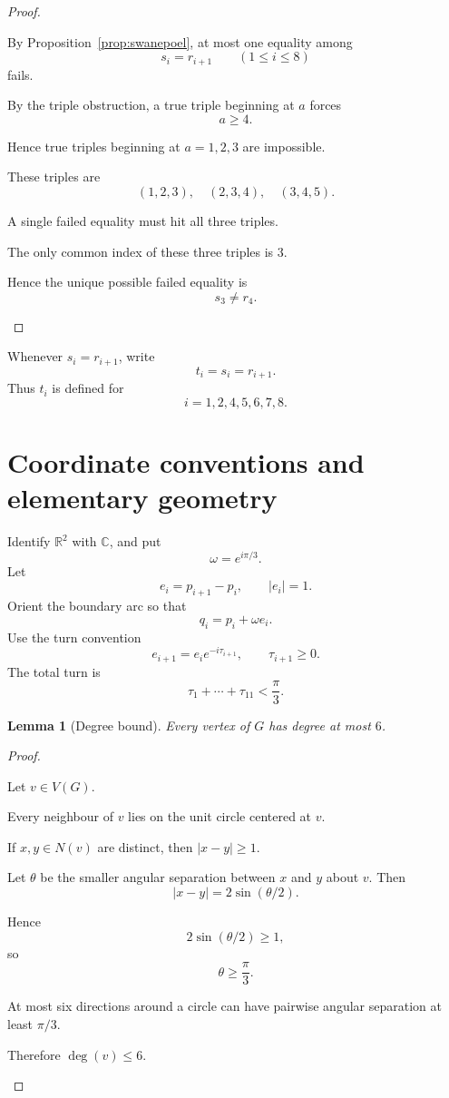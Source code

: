 \documentclass[11pt]{article}
\newtheorem{lemma}{Lemma}
\newcommand{\R}{\mathbb{R}}
\newcommand{\C}{\mathbb{C}}
\begin{document}
\begin{proof}
\begin{lamport}
\item By Proposition~\ref{prop:swanepoel}, at most one equality among
\[
  s_i=r_{i+1}\qquad(1\le i\le 8)
\]
fails.
\item By the triple obstruction, a true triple beginning at $a$ forces
\[
  a\ge 4.
\]
\item Hence true triples beginning at $a=1,2,3$ are impossible.
\item These triples are
\[
  (1,2,3),\quad (2,3,4),\quad (3,4,5).
\]
\item A single failed equality must hit all three triples.
\item The only common index of these three triples is $3$.
\item Hence the unique possible failed equality is
\[
  s_3\ne r_4.
\]
\end{lamport}
\end{proof}

Whenever $s_i=r_{i+1}$, write
\[
  t_i=s_i=r_{i+1}.
\]
Thus $t_i$ is defined for
\[
  i=1,2,4,5,6,7,8.
\]

\section{Coordinate conventions and elementary geometry}

Identify $\R^2$ with $\C$, and put
\[
  \omega=e^{i\pi/3}.
\]
Let
\[
  e_i=p_{i+1}-p_i,
  \qquad |e_i|=1.
\]
Orient the boundary arc so that
\[
  q_i=p_i+\omega e_i.
\]
Use the turn convention
\[
  e_{i+1}=e_i e^{-i\tau_{i+1}},
  \qquad \tau_{i+1}\ge 0.
\]
The total turn is
\[
  \tau_1+\cdots+\tau_{11}<\frac{\pi}{3}.
\]

\begin{lemma}[Degree bound]\label{lem:degree-bound}
Every vertex of $G$ has degree at most $6$.
\end{lemma}

\begin{proof}
\begin{lamport}
\item Let $v\in V(G)$.
\item Every neighbour of $v$ lies on the unit circle centered at $v$.
\item If $x,y\in N(v)$ are distinct, then $|x-y|\ge 1$.
\item Let $\theta$ be the smaller angular separation between $x$ and $y$ about $v$. Then
\[
  |x-y|=2\sin(\theta/2).
\]
\item Hence
\[
  2\sin(\theta/2)\ge 1,
\]
so
\[
  \theta\ge \frac{\pi}{3}.
\]
\item At most six directions around a circle can have pairwise angular separation at least $\pi/3$.
\item Therefore $\deg(v)\le 6$.
\end{lamport}
\end{proof}
\end{document}
